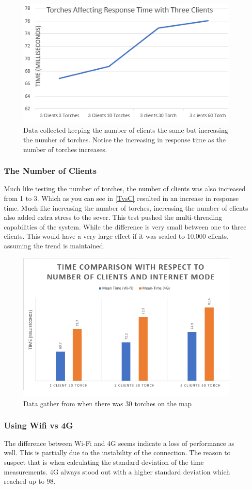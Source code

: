 \documentclass[12pt,a4paper,twoside]{report}
\begin{document}
 \begin{figure}
     \centering
     \includegraphics[width=0.5\linewidth]{Torchvstime.png}
     \caption{Data collected keeping the number of clients the same but increasing the number of torches. Notice the increasing in response time as the number of torches increases.}
     \label{Torchvstime}
 \end{figure}
 
 \newpage

\subsubsection{The Number of Clients}
Much like testing the number of torches, the number of clients was also increased from 1 to 3. Which as you can see in \autoref{TvsC} resulted in an increase in response time. Much like increasing the number of torches, increasing the number of clients also added extra stress to the sever. This test pushed the multi-threading capabilities of the system. While the difference is very small between one to three clients. This would have a very large effect if it was scaled to 10,000 clients, assuming the trend is maintained.

\begin{figure}
     \centering
     \includegraphics[width=0.5\linewidth]{TImecomparison.png}
     \caption{Data gather from when there was 30 torches on the map}
     \label{TvsC}
 \end{figure}
 

 \subsubsection{Using Wifi vs 4G}
 The difference between Wi-Fi and 4G seems indicate a loss of performance as well. This is partially due to the instability of the connection. The reason to suspect that is when calculating the standard deviation of the time measurements. 4G always stood out with a higher standard deviation which reached up to 98.
 
\end{document}
